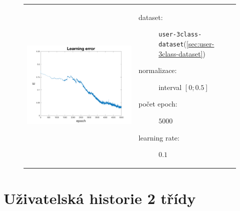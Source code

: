 \documentclass[thesis=M,czech]{FITthesis}[2012/06/26]
\begin{document}
\begin{figure}[htbp]
\begin{tabular}{p{}p{}}
    \begin{minipage}{.5\textwidth}
    \centering
    \includegraphics[scale=0.3]{err_user1.png}
    \label{fig:fig1}
    \end{minipage}
    &
    \begin{minipage}{.5\textwidth}
		\begin{description}
            \item[dataset:] \texttt{user-3class-dataset}(\ref{sec:user-3class-dataset})
            \item[normalizace:] interval $[0;0.5]$
            \item[počet epoch:] $5000$
            \item[learning rate:] $0.1$
        \end{description}
\end{minipage}
\end{tabular}
\end{figure}

\section{Uživatelská historie 2 třídy}\label{exp:user2}
\end{document}
